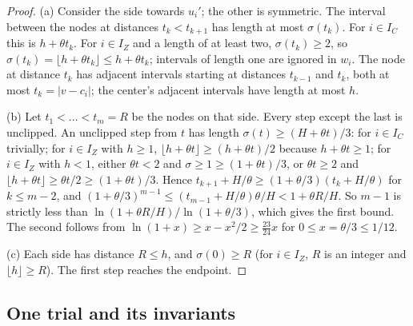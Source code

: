 \begin{proof}
(a) Consider the side towards $u_i'$; the other is symmetric. The interval
between the nodes at distances $t_k<t_{k+1}$ has length at most
$\sigma(t_k)$. For $i\in I_C$ this is $h+\theta t_k$. For $i\in I_Z$ and a
length of at least two, $\sigma(t_k)\ge2$, so
$\sigma(t_k)=\lfloor h+\theta t_k\rfloor\le h+\theta t_k$; intervals of length
one are ignored in $w_i$. The node at distance $t_k$ has adjacent intervals
starting at distances $t_{k-1}$ and $t_k$, both at most $t_k=|v-c_i|$; the
center's adjacent intervals have length at most $h$.

(b) Let $t_1<\dots<t_m=R$ be the nodes on that side. Every step except the
last is unclipped. An unclipped step from $t$ has length
$\sigma(t)\ge(H+\theta t)/3$: for $i\in I_C$ trivially; for $i\in I_Z$ with
$h\ge1$, $\lfloor h+\theta t\rfloor\ge(h+\theta t)/2$ because
$h+\theta t\ge1$; for $i\in I_Z$ with $h<1$, either $\theta t<2$ and
$\sigma\ge1\ge(1+\theta t)/3$, or $\theta t\ge2$ and
$\lfloor h+\theta t\rfloor\ge\theta t/2\ge(1+\theta t)/3$. Hence
$t_{k+1}+H/\theta\ge(1+\theta/3)(t_k+H/\theta)$ for $k\le m-2$, and
$(1+\theta/3)^{m-1}\le(t_{m-1}+H/\theta)\theta/H<1+\theta R/H$. So $m-1$ is
strictly less than $\ln(1+\theta R/H)/\ln(1+\theta/3)$, which gives the first
bound. The second follows from
$\ln(1+x)\ge x-x^2/2\ge\tfrac{23}{24}x$ for $0\le x=\theta/3\le1/12$.

(c) Each side has distance $R\le h$, and $\sigma(0)\ge R$ (for $i\in I_Z$,
$R$ is an integer and $\lfloor h\rfloor\ge R$). The first step reaches the
endpoint.
\end{proof}

\subsection{One trial and its invariants}\label{core:sec:trial}

